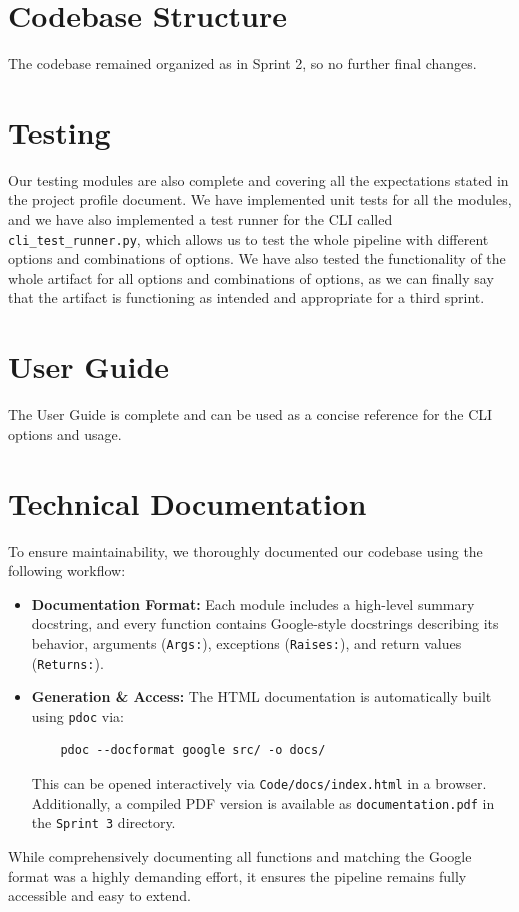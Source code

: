\documentclass[12pt,a4paper]{article}
\begin{document}
\section{Codebase Structure}
The codebase remained organized as in Sprint 2, so no further final changes.

\section{Testing}
Our testing modules are also complete and covering all the expectations stated in the project profile document. We have implemented unit tests for all the modules, and we have also implemented a test runner for the CLI called \texttt{cli\_test\_runner.py}, which allows us to test the whole pipeline with different options and combinations of options. We have also tested the functionality of the whole artifact for all options and combinations of options, as we can finally say that the artifact is functioning as intended and appropriate for a third sprint.
\section{User Guide}
The User Guide is complete and can be used as a concise reference for the CLI options and usage.

\section{Technical Documentation}
To ensure maintainability, we thoroughly documented our codebase using the following workflow:
\begin{itemize}
    \item \textbf{Documentation Format:} Each module includes a high-level summary docstring, and every function contains Google-style docstrings describing its behavior, arguments (\texttt{Args:}), exceptions (\texttt{Raises:}), and return values (\texttt{Returns:}).
    \item \textbf{Generation \& Access:} The HTML documentation is automatically built using \texttt{pdoc} via:
    \begin{verbatim}
    pdoc --docformat google src/ -o docs/
    \end{verbatim}
    This can be opened interactively via \texttt{Code/docs/index.html} in a browser. Additionally, a compiled PDF version is available as \texttt{documentation.pdf} in the \texttt{Sprint 3} directory.
\end{itemize}
While comprehensively documenting all functions and matching the Google format was a highly demanding effort, it ensures the pipeline remains fully accessible and easy to extend.
\end{document}
